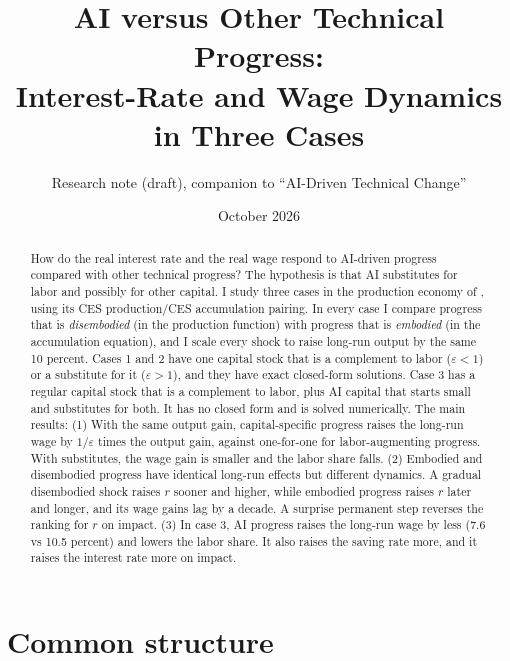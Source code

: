 \documentclass[11pt]{article}
\title{AI versus Other Technical Progress:\\ Interest-Rate and Wage Dynamics in Three Cases}
\author{Research note (draft), companion to ``AI-Driven Technical Change''}
\date{October 2026}
\newcommand{\e}{\varepsilon}
\begin{document}
\maketitle

\begin{abstract}
\noindent How do the real interest rate and the real wage respond to AI-driven progress
compared with other technical progress? The hypothesis is that AI substitutes for labor
and possibly for other capital. I study three cases in the production economy of
\citet{kiley2004}, using its CES production/CES accumulation pairing. In every case I
compare progress that is \emph{disembodied} (in the production function) with progress
that is \emph{embodied} (in the accumulation equation), and I scale every shock to raise
long-run output by the same 10 percent. Cases 1 and 2 have one capital stock that is a
complement to labor ($\e<1$) or a substitute for it ($\e>1$), and they have exact closed-form
solutions. Case 3 has a regular capital stock that is a complement to labor, plus AI
capital that starts small and substitutes for both. It has no closed form and is solved
numerically. The main results:
(1) With the same output gain, capital-specific progress raises the long-run wage by
$1/\e$ times the output gain, against one-for-one for labor-augmenting progress. With
substitutes, the wage gain is smaller and the labor share falls.
(2) Embodied and disembodied progress have identical long-run effects but different
dynamics. A gradual disembodied shock raises $r$ sooner and higher, while embodied
progress raises $r$ later and longer, and its wage gains lag by a decade. A surprise
permanent step reverses the ranking for $r$ on impact.
(3) In case 3, AI progress raises the long-run wage by less (7.6 vs 10.5 percent) and
lowers the labor share. It also raises the saving rate more, and it raises the
interest rate more on impact.
\end{abstract}

\section{Common structure}
\end{document}
